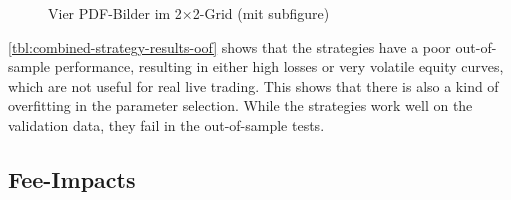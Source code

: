 \begin{figure}[htbp]
    \centering
    \hfill

    \vspace{0.5cm}

    \hfill

    \caption{Vier PDF-Bilder im 2×2-Grid (mit subfigure)}
\end{figure}


\autoref{tbl:combined-strategy-results-oof} shows that the strategies have a poor out-of-sample performance, resulting in either high losses or very volatile equity curves, which are not useful for real live trading.
This shows that there is also a kind of overfitting in the parameter selection.
While the strategies work well on the validation data, they fail in the out-of-sample tests.

\subsection{Fee-Impacts}
